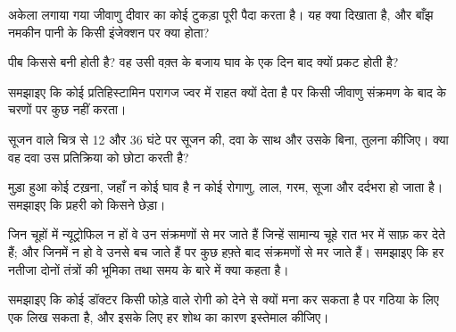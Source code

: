 \begin{exercise}[$\star\star$]\label{exo:g12:innate-immunity:7}
अकेला लगाया गया जीवाणु दीवार का कोई टुकड़ा पूरी  पैदा करता
है। यह क्या दिखाता है, और बाँझ नमकीन पानी के किसी इंजेक्शन पर क्या होता?
\end{exercise}

\begin{exercise}[$\star\star$]\label{exo:g12:innate-immunity:8}
पीब किससे बनी होती है? वह उसी वक़्त के बजाय घाव के एक दिन बाद क्यों प्रकट
होती है?
\end{exercise}

\begin{exercise}[$\star\star$]\label{exo:g12:innate-immunity:9}
समझाइए कि कोई प्रतिहिस्टामिन परागज ज्वर में राहत क्यों देता है पर किसी
जीवाणु संक्रमण के बाद के चरणों पर कुछ नहीं करता।
\end{exercise}

\begin{exercise}[$\star\star$]\label{exo:g12:innate-immunity:10}
सूजन वाले चित्र से 12 और 36 घंटे पर सूजन की, दवा के साथ और उसके बिना, तुलना
कीजिए। क्या वह दवा उस प्रतिक्रिया को छोटा करती है?
\end{exercise}

\begin{exercise}[$\star\star$]\label{exo:g12:innate-immunity:11}
मुड़ा हुआ कोई टख़ना, जहाँ न कोई घाव है न कोई रोगाणु, लाल, गरम, सूजा और
दर्दभरा हो जाता है। समझाइए कि प्रहरी  को किसने छेड़ा।
\end{exercise}

\begin{exercise}[$\star\star\star$]\label{exo:g12:innate-immunity:12}
जिन चूहों में न्यूट्रोफिल न हों वे उन संक्रमणों से मर जाते हैं जिन्हें
सामान्य चूहे रात भर में साफ़ कर देते हैं; और जिनमें  न हो
वे उनसे बच जाते हैं पर कुछ हफ़्ते बाद संक्रमणों से मर जाते हैं। समझाइए कि
हर नतीजा दोनों तंत्रों की भूमिका तथा समय के बारे में क्या कहता है।
\end{exercise}

\begin{exercise}[$\star\star\star$]\label{exo:g12:innate-immunity:13}
समझाइए कि कोई डॉक्टर किसी फोड़े वाले रोगी को  देने से क्यों मना
कर सकता है पर गठिया के लिए एक लिख सकता है, और इसके लिए हर शोथ का कारण
इस्तेमाल कीजिए।
\end{exercise}

